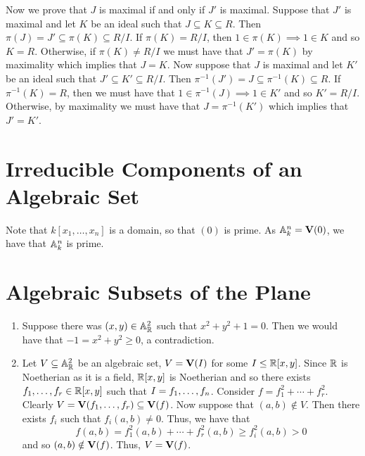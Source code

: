 \documentclass[letterpaper, 11pt, oneside]{book}
\begin{document}
\begin{sol}
\begin{enumerate}[label= (\alph*)]
          Now we prove that $J$ is maximal if and only if $J'$ is maximal.
          Suppose that $J'$ is maximal and let $K$ be an ideal such that $J \subseteq K \subseteq R$.
          Then $\pi(J) = J' \subseteq \pi(K) \subseteq R/I$.
          If $\pi(K) = R / I$, then $1 \in \pi(K) \implies 1 \in K$ and so $K = R$.
          Otherwise, if $\pi(K) \neq R / I$ we must have that $J' = \pi(K)$ by maximality which implies that $J = K$.
          Now suppose that $J$ is maximal and let $K'$ be an ideal such that $J' \subseteq K' \subseteq R/I$.
          Then $\pi^{-1}(J') = J \subseteq \pi^{-1}(K) \subseteq R$.
          If $\pi^{-1}(K) = R$, then we must have that $1 \in \pi^{-1}(J) \implies 1 \in K'$ and so $K' = R/I$.
          Otherwise, by maximality we must have that $J = \pi^{-1}(K')$ which implies that $J' = K'$.
  \end{enumerate}
\end{sol}

\clearpage

\section{Irreducible Components of an Algebraic Set}

\begin{sol}\label{ex:Curves_1.29}
  Note that $k[x_{1}, \ldots, x_{n}]$ is a domain, so that $(0)$ is prime.
  As $\mathbb{A}_{k}^{n} = \operatorname{\mathbf{V}}(0)$, we have that $\mathbb{A}_{k}^{n}$ is prime.
\end{sol}

\clearpage

\section{Algebraic Subsets of the Plane}

\begin{sol}\label{ex:Curves_1.30}
  \begin{enumerate}[label= (\alph*)]
    \item Suppose there was $(x, y) \in \mathbb{A}_{\mathbb{R}}^{2}$ such that $x^{2} + y^{2} + 1 = 0$.
          Then we would have that $-1 = x^{2} + y^{2} \geq 0$, a contradiction.
    \item Let $V \subseteq \mathbb{A}_{\mathbb{R}}^{2}$ be an algebraic set, $V = \operatorname{\mathbf{V}}(I)$ for some $I \leq \mathbb{R}[x, y]$.
          Since $\mathbb{R}$ is Noetherian as it is a field, $\mathbb{R}[x, y]$ is Noetherian and so there exists $f_{1}, \ldots, f_{r} \in \mathbb{R}[x, y]$ such that $I = \ideal{f_{1}, \ldots, f_{n}}$.
          Consider $f = f_{1}^{2} + \cdots + f_{r}^{2}$.
          Clearly $V = \operatorname{\mathbf{V}}(f_{1}, \ldots, f_{r}) \subseteq \operatorname{\mathbf{V}}(f)$.
          Now suppose that $(a, b) \notin V$.
          Then there exists $f_{i}$ such that $f_{i}(a, b) \neq 0$.
          Thus, we have that
          \[
            f(a, b) = f_{1}^{2}(a, b) + \cdots + f_{r}^{2}(a, b) \geq f_{i}^{2}(a, b) > 0
          \]
          and so $(a, b) \notin \operatorname{\mathbf{V}}(f)$.
          Thus, $V = \operatorname{\mathbf{V}}(f)$.
  \end{enumerate}
\end{sol}
\end{document}

